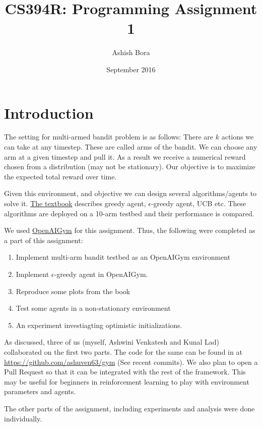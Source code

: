 \documentclass{article}
\title{CS394R: Programming Assignment 1}
\author{Ashish Bora}
\date{September 2016}
\begin{document}
\maketitle

\section{Introduction}

The setting for multi-armed bandit problem is as follows: There are $k$ actions we can take at any timestep. These are called arms of the bandit. We can choose any arm at a given timestep and pull it. As a result we receive a numerical reward chosen from a distribution (may not be stationary). Our objective is to maximize the expected total reward over time.

Given this environment, and objective we can design several algorithms/agents to solve it. \href{https://www.dropbox.com/s/b3psxv2r0ccmf80/book2015oct.pdf}{The textbook} describes greedy agent, $\epsilon$-greedy agent, UCB etc. These algorithms are deployed on a 10-arm testbed and their performance is compared.

We used \href{https://github.com/openai/gym}{OpenAIGym} for this assignment. Thus, the following were completed as a part of this assignment:
\begin{enumerate}
    \item Implement multi-arm bandit testbed as an OpenAIGym environment
    \item Implement $\epsilon$-greedy agent in OpenAIGym.
    \item Reproduce some plots from the book
    \item Test some agents in a non-stationary environment
    \item An experiment investiagting optimistic initializations.
\end{enumerate}

As discussed, three of us (myself, Ashwini Venkatesh and Kunal Lad) collaborated on the first two parts. The code for the same can be found in at \href{https://github.com/ashuven63/gym}{https://github.com/ashuven63/gym} (See recent commits). We also plan to open a Pull Request so that it can be integrated with the rest of the framework. This may be useful for beginners in reinforcement learning to play with environment parameters and agents.

The other parts of the assignment, including experiments and analysis were done individually.
\end{document}
